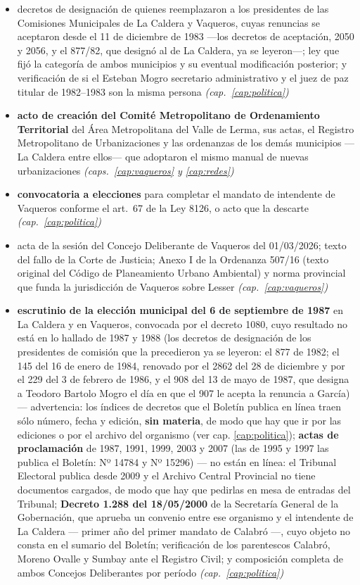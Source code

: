 \begin{itemize}[leftmargin=*]
\item decretos de designación de quienes reemplazaron a los presidentes de las Comisiones Municipales de La Caldera y Vaqueros, cuyas renuncias se aceptaron desde el 11 de diciembre de 1983 ---los decretos de aceptación, 2050 y 2056, y el 877/82, que designó al de La Caldera, ya se leyeron---; ley que fijó la categoría de ambos municipios y su eventual modificación posterior; y verificación de si el Esteban Mogro secretario administrativo y el juez de paz titular de 1982--1983 son la misma persona \textit{(cap.\ \ref{cap:politica})}
\item \textbf{acto de creación del Comité Metropolitano de Ordenamiento Territorial} del Área Metropolitana del Valle de Lerma, sus actas, el Registro Metropolitano de Urbanizaciones y las ordenanzas de los demás municipios ---La Caldera entre ellos--- que adoptaron el mismo manual de nuevas urbanizaciones \textit{(caps.\ \ref{cap:vaqueros} y \ref{cap:redes})}
\item \textbf{convocatoria a elecciones} para completar el mandato de intendente de Vaqueros conforme el art.\ 67 de la Ley 8126, o acto que la descarte \textit{(cap.\ \ref{cap:politica})}
\item acta de la sesión del Concejo Deliberante de Vaqueros del 01/03/2026; texto del fallo de la Corte de Justicia; Anexo I de la Ordenanza 507/16 (texto original del Código de Planeamiento Urbano Ambiental) y norma provincial que funda la jurisdicción de Vaqueros sobre Lesser \textit{(cap.\ \ref{cap:vaqueros})}
\item \textbf{escrutinio de la elección municipal del 6 de septiembre de 1987} en La Caldera y en Vaqueros, convocada por el decreto 1080, cuyo resultado no está en lo hallado de 1987 y 1988 (los decretos de designación de los presidentes de comisión que la precedieron ya se leyeron: el 877 de 1982; el 145 del 16 de enero de 1984, renovado por el 2862 del 28 de diciembre y por el 229 del 3 de febrero de 1986, y el 908 del 13 de mayo de 1987, que designa a Teodoro Bartolo Mogro el día en que el 907 le acepta la renuncia a García) --- advertencia: los índices de decretos que el Boletín publica en línea traen sólo número, fecha y edición, \textbf{sin materia}, de modo que hay que ir por las ediciones o por el archivo del organismo (ver cap. \ref{cap:politica}); \textbf{actas de proclamación} de 1987, 1991, 1999, 2003 y 2007 (las de 1995 y 1997 las publica el Boletín: Nº 14784 y Nº 15296) --- no están en línea: el Tribunal Electoral publica desde 2009 y el Archivo Central Provincial no tiene documentos cargados, de modo que hay que pedirlas en mesa de entradas del Tribunal; \textbf{Decreto 1.288 del 18/05/2000} de la Secretaría General de la Gobernación, que aprueba un convenio entre ese organismo y el intendente de La Caldera --- primer año del primer mandato de Calabró ---, cuyo objeto no consta en el sumario del Boletín; verificación de los parentescos Calabró, Moreno Ovalle y Sumbay ante el Registro Civil; y composición completa de ambos Concejos Deliberantes por período \textit{(cap.\ \ref{cap:politica})}

\end{itemize}
